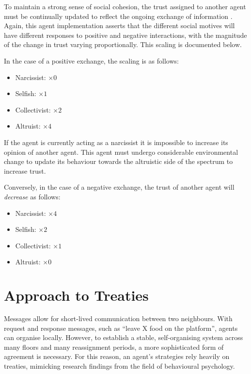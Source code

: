 To maintain a strong sense of social cohesion, the trust assigned to another agent must be continually updated to reflect the ongoing exchange of information \cite{trustEEE}. Again, this agent implementation asserts that the different social motives will have different responses to positive and negative interactions, with the magnitude of the change in trust varying proportionally. This scaling is documented below.

In the case of a positive exchange, the scaling is as follows:
\begin{itemize}
    \item Narcissist: $\times 0$
    \item Selfish: $\times 1$
    \item Collectivist: $\times 2$
    \item Altruist: $\times 4$
\end{itemize}

If the agent is currently acting as a narcissist it is impossible to increase its opinion of another agent. This agent must undergo considerable environmental change to update its behaviour towards the altruistic side of the spectrum to increase trust.

Conversely, in the case of a negative exchange, the trust of another agent will \textit{decrease} as follows:
\begin{itemize}
    \item Narcissist: $\times 4$
    \item Selfish: $\times 2$
    \item Collectivist: $\times 1$
    \item Altruist: $\times 0$
\end{itemize}


\section{Approach to Treaties}\label{self-organization}

Messages allow for short-lived communication between two neighbours. With request and response messages, such as “leave X food on the platform”, agents can organise locally. However, to establish a stable, self-organising system across many floors and many reassignment periods, a more sophisticated form of agreement is necessary. For this reason, an agent's strategies rely heavily on treaties, mimicking research findings from the field of behavioural psychology.

